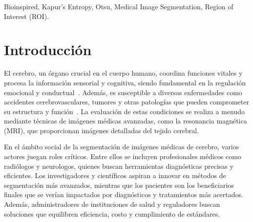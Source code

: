\documentclass{elsarticle}
\begin{document}
\begin{frontmatter}
\begin{abstract}
\noindent Los resultados revelan que los algoritmos Grey Wolf Optimizer (GWO) y Tuna Swarm Optimization (TSO) son superiores en la optimización de la entropía de Kapur,entropía de Tsallis y el método de Otsu, ofreciendo también un rendimiento destacado en las funciones objetivo basadas en Otsu y entropía de Tsallis. Mientras que las diferencias en la métrica PSNR entre GWO, CSA, HBA y OPA no son significativas, el GWO exhibe una mejora considerable en el índice SSIM. Esto sugiere que GWO es el algoritmo más competente, proporcionando la mejor performance general según las métricas evaluadas.

\noindent Estos hallazgos posicionan al algoritmo GWO como una opción prometedora para la segmentación avanzada de tejido cerebral, con aplicaciones potenciales significativas en el ámbito clínico y de investigación, donde la precisión en la definición de las estructuras cerebrales es crítica para el diagnóstico y la intervención médica efectiva.
\end{abstract}

\begin{keyword}
Bioinspired, Kapur's Entropy, Otsu, Medical Image Segmentation, Region of Interest (ROI).
\end{keyword}

\end{frontmatter}

\linenumbers

\section{Introducción}

\noindent El cerebro, un órgano crucial en el cuerpo humano, coordina funciones vitales y procesa la información sensorial y cognitiva, siendo fundamental en la regulación emocional y conductual~\cite{Raichle2010}. Además, es susceptible a diversas enfermedades como accidentes cerebrovasculares, tumores y otras patologías que pueden comprometer su estructura y función~\cite{Fornito2015,Kreisl2008}. La evaluación de estas condiciones se realiza a menudo mediante técnicas de imágenes médicas avanzadas, como la resonancia magnética (MRI), que proporcionan imágenes detalladas del tejido cerebral\cite{Young2007,Mehrabian2019}.

\noindent En el ámbito social de la segmentación de imágenes médicas de cerebro, varios actores juegan roles críticos. Entre ellos se incluyen profesionales médicos como radiólogos y neurologos, quienes buscan herramientas diagnósticas precisas y eficientes. Los investigadores y científicos aspiran a innovar en métodos de segmentación más avanzados, mientras que los pacientes son los beneficiarios finales que se verían impactados por diagnósticos y tratamientos más acertados. Además, administradores de instituciones de salud y reguladores buscan soluciones que equilibren eficiencia, costo y cumplimiento de estándares.
\end{document}
